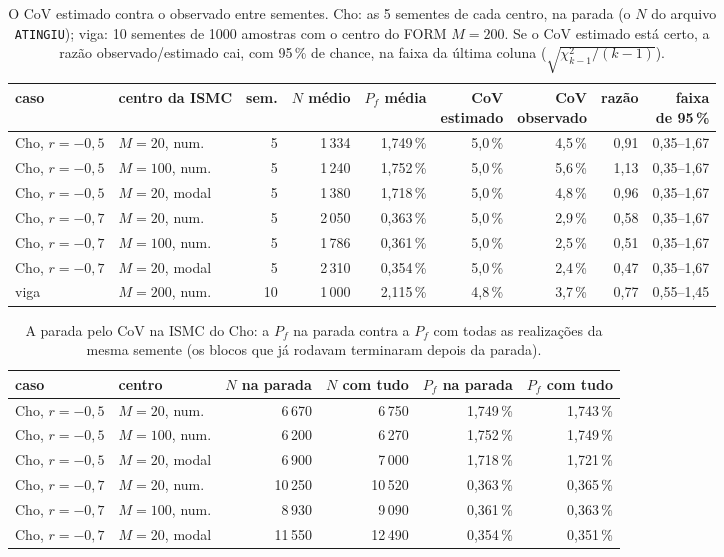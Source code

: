 \begin{table}[H]\centering\footnotesize
\caption{O CoV estimado contra o observado entre sementes. Cho: as 5 sementes de cada centro, na parada (o $N$ do arquivo \texttt{ATINGIU}); viga: 10 sementes de 1000 amostras com o centro do FORM $M = 200$. Se o CoV estimado está certo, a razão observado/estimado cai, com 95\,\% de chance, na faixa da última coluna ($\sqrt{\chi^2_{k-1}/(k-1)}$).}\label{tab:covobs}
\begin{tabular}{llrrrrrrr}\toprule
caso & centro da ISMC & sem. & $N$ médio & $P_f$ média & \makecell{CoV\\estimado} & \makecell{CoV\\observado} & razão & \makecell{faixa\\de 95\,\%} \\\midrule
Cho, $r = -0{,}5$ & $M = 20$, num. & 5 & 1\,334 & 1,749\,\% & 5,0\,\% & 4,5\,\% & 0,91 & 0,35--1,67 \\
Cho, $r = -0{,}5$ & $M = 100$, num. & 5 & 1\,240 & 1,752\,\% & 5,0\,\% & 5,6\,\% & 1,13 & 0,35--1,67 \\
Cho, $r = -0{,}5$ & $M = 20$, modal & 5 & 1\,380 & 1,718\,\% & 5,0\,\% & 4,8\,\% & 0,96 & 0,35--1,67 \\
Cho, $r = -0{,}7$ & $M = 20$, num. & 5 & 2\,050 & 0,363\,\% & 5,0\,\% & 2,9\,\% & 0,58 & 0,35--1,67 \\
Cho, $r = -0{,}7$ & $M = 100$, num. & 5 & 1\,786 & 0,361\,\% & 5,0\,\% & 2,5\,\% & 0,51 & 0,35--1,67 \\
Cho, $r = -0{,}7$ & $M = 20$, modal & 5 & 2\,310 & 0,354\,\% & 5,0\,\% & 2,4\,\% & 0,47 & 0,35--1,67 \\
viga & $M = 200$, num. & 10 & 1\,000 & 2,115\,\% & 4,8\,\% & 3,7\,\% & 0,77 & 0,55--1,45 \\
\bottomrule\end{tabular}\end{table}
\begin{table}[H]\centering\footnotesize
\caption{A parada pelo CoV na ISMC do Cho: a $P_f$ na parada contra a $P_f$ com todas as realizações da mesma semente (os blocos que já rodavam terminaram depois da parada).}\label{tab:parada}
\begin{tabular}{llrrrr}\toprule
caso & centro & $N$ na parada & $N$ com tudo & $P_f$ na parada & $P_f$ com tudo \\\midrule
Cho, $r = -0{,}5$ & $M = 20$, num. & 6\,670 & 6\,750 & 1,749\,\% & 1,743\,\% \\
Cho, $r = -0{,}5$ & $M = 100$, num. & 6\,200 & 6\,270 & 1,752\,\% & 1,749\,\% \\
Cho, $r = -0{,}5$ & $M = 20$, modal & 6\,900 & 7\,000 & 1,718\,\% & 1,721\,\% \\
Cho, $r = -0{,}7$ & $M = 20$, num. & 10\,250 & 10\,520 & 0,363\,\% & 0,365\,\% \\
Cho, $r = -0{,}7$ & $M = 100$, num. & 8\,930 & 9\,090 & 0,361\,\% & 0,363\,\% \\
Cho, $r = -0{,}7$ & $M = 20$, modal & 11\,550 & 12\,490 & 0,354\,\% & 0,351\,\% \\
\bottomrule\end{tabular}\end{table}
